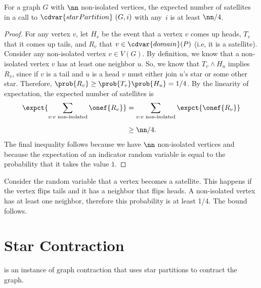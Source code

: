 \begin{group}
\begin{lemma}
  For a graph $G$ with $\nn$ non-isolated vertices, the expected
  number of satellites in a call to $\cdvar{starPartition}~(G,i)$ with
  any~$i$ is at least $\nn/4$.
\end{lemma}

\begin{proof}
  For any vertex $v$, let $H_v$ be the event that a vertex $v$ comes
  up heads, $T_v$ that it comes up tails, and $R_v$ that $v \in
  \cdvar{domain}(P)$ (i.e, it is a satellite).
%
  Consider any non-isolated vertex $v \in V(G)$.  By definition, we
  know that a non-isolated vertex $v$ has at least one neighbor $u$.
  So, we know that $T_v \land H_u$ implies $R_v$, since if $v$ is a
  tail and $u$ is a head $v$ must either join $u$'s star or some other
  star.  Therefore, $\prob{R_v} \geq \prob{T_v} \prob{H_u} = 1/4$.  By
  the linearity of expectation,  the expected number of satellites is
  \begin{align*}
    \expct{\sum_{v: v \text{ non-isolated}} \onef{R_v}} & = \sum_{v: v
      \text{ non-isolated}} \expct{\onef{R_v}} 
\\[2mm]
  & \geq \nn/4.
  \end{align*}
  The final inequality follows because we have $\nn$ non-isolated
  vertices and because the expectation of an indicator random variable
  is equal to the probability that it takes the value $1$.
\end{proof}
\end{group}

\begin{teachnote}
Consider the random variable that a vertex becomes a satellite.  This
happens if the vertex flips tails and it has a neighbor that flips
heads.  A non-isolated vertex has at least one neighbor, therefore
this probability is at least 1/4.  The bound follows.
\end{teachnote}

\section{Star Contraction}
\label{sec:graphcon::star::contract}

\begin{definition}
 is an instance of graph contraction that uses
star partitions to contract the graph.
\end{definition}


